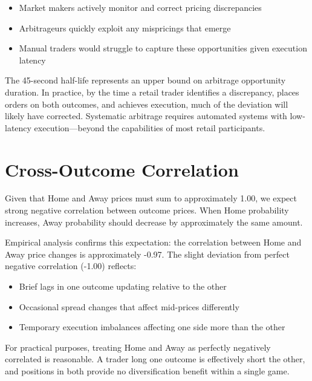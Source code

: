 \begin{itemize}
    \item Market makers actively monitor and correct pricing discrepancies
    \item Arbitrageurs quickly exploit any mispricings that emerge
    \item Manual traders would struggle to capture these opportunities given execution latency
\end{itemize}

The 45-second half-life represents an upper bound on arbitrage opportunity duration. In practice, by the time a retail trader identifies a discrepancy, places orders on both outcomes, and achieves execution, much of the deviation will likely have corrected. Systematic arbitrage requires automated systems with low-latency execution---beyond the capabilities of most retail participants.

\section{Cross-Outcome Correlation}

Given that Home and Away prices must sum to approximately 1.00, we expect strong negative correlation between outcome prices. When Home probability increases, Away probability should decrease by approximately the same amount.

Empirical analysis confirms this expectation: the correlation between Home and Away price changes is approximately -0.97. The slight deviation from perfect negative correlation (-1.00) reflects:

\begin{itemize}
    \item Brief lags in one outcome updating relative to the other
    \item Occasional spread changes that affect mid-prices differently
    \item Temporary execution imbalances affecting one side more than the other
\end{itemize}

For practical purposes, treating Home and Away as perfectly negatively correlated is reasonable. A trader long one outcome is effectively short the other, and positions in both provide no diversification benefit within a single game.

